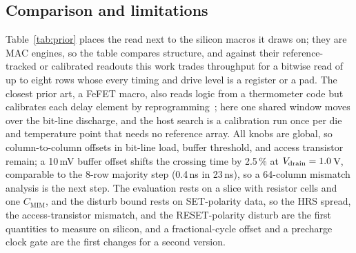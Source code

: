 \subsection{Comparison and limitations}
\begin{table}[!t]
\centering
\caption{Comparison with RRAM and time-domain macros}
\label{tab:prior}
\scriptsize
\setlength{\tabcolsep}{1.3pt}

\end{table}
Table~\ref{tab:prior} places the read next to the silicon macros it draws on; they are MAC engines, so the table compares structure, and against their reference-tracked or calibrated readouts this work trades throughput for a bitwise read of up to eight rows whose every timing and drive level is a register or a pad.
The closest prior art, a FeFET macro, also reads logic from a thermometer code but calibrates each delay element by reprogramming~\cite{mattar2025fefet}; here one shared window moves over the bit-line discharge, and the host search is a calibration run once per die and temperature point that needs no reference array.
All knobs are global, so column-to-column offsets in bit-line load, buffer threshold, and access transistor remain; a 10\,mV buffer offset shifts the crossing time by 2.5\,\% at $V_\mathrm{drain}=1.0$\,V, comparable to the 8-row majority step (0.4\,ns in 23\,ns), so a 64-column mismatch analysis is the next step.
The evaluation rests on a slice with resistor cells and one $C_\mathrm{MIM}$, and the disturb bound rests on SET-polarity data, so the HRS spread, the access-transistor mismatch, and the RESET-polarity disturb are the first quantities to measure on silicon, and a fractional-cycle offset and a precharge clock gate are the first changes for a second version.
